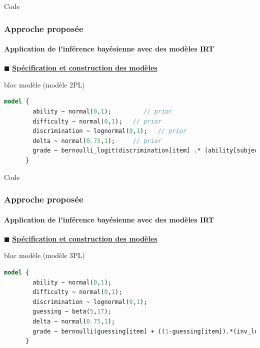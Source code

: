\documentclass[aspectratio=169,professionalfonts, 12pt]{beamer}
\begin{document}
\begin{frame}[fragile]{Code}
  \frametitle{Approche proposée}
  \framesubtitle{Application de l'inférence bayésienne avec des modèles IRT}
  \justifying 
  \(\displaystyle \blacksquare \) \textbf{\underline{Spécification et construction des modèles}}
  \begin{minipage}{\textwidth}
  \begin{block}{bloc modèle (modèle 2PL)}
    \begin{lstlisting}[language=Stan,basicstyle=\scriptsize,framesep=4.5mm,framexleftmargin=2.5mm,tabsize=2]
      model {
        ability ~ normal(0,1);         // prior
        difficulty ~ normal(0,1);   // prior
        discrimination ~ lognormal(0,1);   // prior
        delta ~ normal(0.75,1);     // prior
        grade ~ bernoulli_logit(discrimination[item] .* (ability[subject] - (difficulty[item] + delta)));	
      }
    \end{lstlisting}
  \end{block}
  \end{minipage}
\end{frame}

\begin{frame}[fragile]{Code}
  \frametitle{Approche proposée}
  \framesubtitle{Application de l'inférence bayésienne avec des modèles IRT}
  \justifying 
  \(\displaystyle \blacksquare \) \textbf{\underline{Spécification et construction des modèles}}
  \begin{minipage}{\textwidth}
  \begin{block}{bloc modèle (modèle 3PL)}
    \begin{lstlisting}[language=Stan,basicstyle=\scriptsize,framesep=4.5mm,framexleftmargin=2.5mm,tabsize=2]
      model {
        ability ~ normal(0,1);         
        difficulty ~ normal(0,1);   
        discrimination ~ lognormal(0,1);
        guessing ~ beta(5,17);
        delta ~ normal(0.75,1);
        grade ~ bernoulli(guessing[item] + ((1-guessing[item]).*(inv_logit(discrimination[item] .* (ability[subject] - (difficulty[item] + delta))))));
      }
    \end{lstlisting}
  \end{block}
  \end{minipage}
\end{frame}
\end{document}

